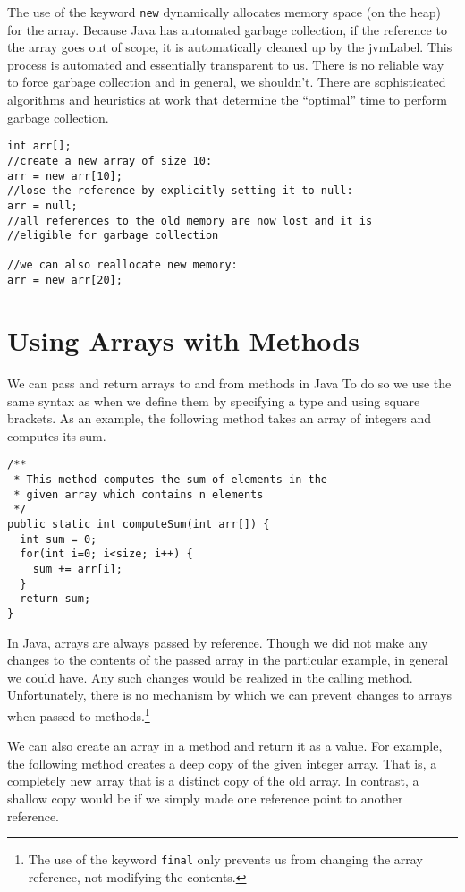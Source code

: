 The use of the keyword \texttt{new} dynamically allocates 
memory space (on the heap) for the array.  Because Java has
automated garbage collection, if the reference to the array goes
out of scope, it is automatically cleaned up by the \gls{jvmLabel}.
This process is automated and essentially transparent to us.
There is no reliable way to force garbage collection and in general, 
we shouldn't.  There are sophisticated algorithms and heuristics
at work that determine the ``optimal'' time to perform garbage
collection.

\begin{verbatim}
int arr[];
//create a new array of size 10:
arr = new arr[10];
//lose the reference by explicitly setting it to null:
arr = null;
//all references to the old memory are now lost and it is 
//eligible for garbage collection

//we can also reallocate new memory: 
arr = new arr[20];
\end{verbatim}

\section{Using Arrays with Methods}

We can pass and return arrays to and from methods in Java
To do so we use the same syntax as when we define them
by specifying a type and using square brackets.  As an example, 
the following method takes an array of integers and computes 
its sum.

\begin{verbatim}
/**
 * This method computes the sum of elements in the
 * given array which contains n elements
 */
public static int computeSum(int arr[]) {
  int sum = 0;
  for(int i=0; i<size; i++) {
    sum += arr[i];
  }
  return sum;
}
\end{verbatim}

In Java, arrays are always passed by reference.  Though we
did not make any changes to the contents of the passed array
in the particular example, in general we could have.  Any
such changes would be realized in the calling method.  Unfortunately, 
there is no mechanism by which we can prevent changes to
arrays when passed to methods.\footnote{The use of the keyword
\texttt{final} only prevents us from changing the
array reference, not modifying the contents.}

We can also create an array in a method and return it as a value.  
For example, the following method creates a \gls{deep copy} of
the given integer array.  That is, a completely new array that
is a distinct copy of the old array.  In contrast, a \gls{shallow copy}
would be if we simply made one reference point to another reference.

